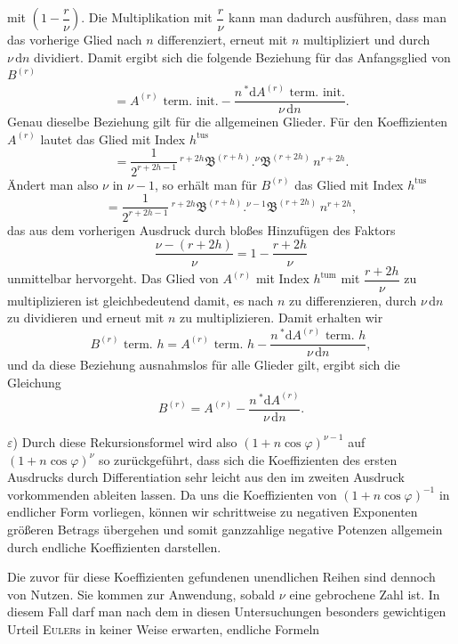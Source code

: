 mit $\left(1-\dfrac{r}{\nu}\right)$. Die Multiplikation mit $\dfrac{r}{\nu}$ kann man dadurch ausführen, dass
man das vorherige Glied nach $n$ differenziert, erneut mit $n$ multipliziert und durch $\nu\,\mathrm{d}n$ dividiert.
Damit ergibt sich die folgende Beziehung für das Anfangsglied von $B^{(r)}$
\[
= A^{(r)}\text{ term. init.} - \frac{n\,{}^{*}\!\mathrm{d}A^{(r)}\text{ term. init.}}{\nu\,\mathrm{d}n}.
\]
Genau dieselbe Beziehung gilt für die allgemeinen Glieder. Für den Koeffizienten
$A^{(r)}$ lautet das Glied mit Index $h^{\mathrm{tus}}$
\[
= \frac{1}{2^{r+2h-1}}\,{}^{r+2h}\mathfrak{B}^{(r+h)} . {}^{\nu}\mathfrak{B}^{(r+2h)}\,n^{r+2h}.
\]
Ändert man also $\nu$ in $\nu-1$, so erhält man für $B^{(r)}$ das Glied mit Index $h^{\mathrm{tus}}$
\[
= \frac{1}{2^{r+2h-1}}\,{}^{r+2h}\mathfrak{B}^{(r+h)} . {}^{\nu-1}\mathfrak{B}^{(r+2h)}\,n^{r+2h},
\]
das aus dem vorherigen Ausdruck durch bloßes Hinzufügen des Faktors
\[
\frac{\nu-(r+2h)}{\nu} = 1 - \frac{r+2h}{\nu}
\]
unmittelbar hervorgeht. Das Glied von
$A^{(r)}$ mit Index $h^{\mathrm{tum}}$ mit $\dfrac{r+2h}{\nu}$ zu multiplizieren ist gleichbedeutend damit, es nach
$n$ zu differenzieren, durch $\nu\,\mathrm{d}n$ zu dividieren und erneut mit $n$ zu multiplizieren. Damit erhalten wir
\[
B^{(r)}\text{ term. }h = A^{(r)}\text{ term. }h - \frac{n\,{}^{*}\!\mathrm{d}A^{(r)}\text{ term. }h}{\nu\,\mathrm{d}n},
\]
und da diese Beziehung ausnahmslos für alle Glieder gilt, ergibt sich die Gleichung
\[
B^{(r)} = A^{(r)} - \frac{n\,{}^{*}\!\mathrm{d}A^{(r)}}{\nu\,\mathrm{d}n}.
\]
\par\noindent\hspace*{\parindent}$\varepsilon$) Durch diese Rekursionsformel wird also $(1+n\cos\varphi)^{\nu-1}$ auf $(1+n\cos\varphi)^{\nu}$
so zurückgeführt, dass sich die Koeffizienten des ersten Ausdrucks durch Differentiation sehr leicht
aus den im zweiten Ausdruck vorkommenden ableiten lassen. Da uns die Koeffizienten von $(1+n\cos\varphi)^{-1}$
in endlicher Form vorliegen, können wir schrittweise zu negativen Exponenten größeren Betrags übergehen
und somit ganzzahlige negative Potenzen allgemein durch endliche Koeffizienten darstellen.

Die zuvor für diese Koeffizienten gefundenen unendlichen Reihen sind dennoch von Nutzen.
Sie kommen zur Anwendung, sobald $\nu$ eine gebrochene Zahl ist. In diesem Fall darf man nach dem in diesen
Untersuchungen besonders gewichtigen Urteil \textsc{Euler}s in keiner Weise erwarten, endliche Formeln

